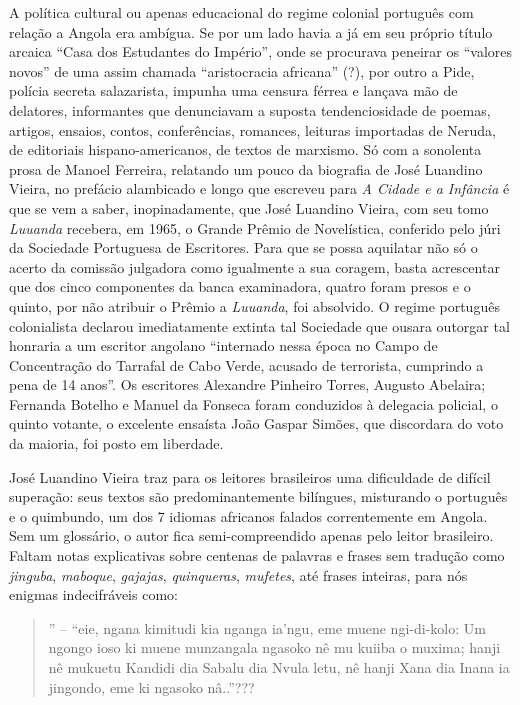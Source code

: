 \documentclass[
  letterpaper,
  DIV=11,
  numbers=noendperiod]{scrreprt}
\begin{document}
A política cultural ou apenas educacional do regime colonial português
com relação a Angola era ambígua. Se por um lado havia a já em seu
próprio título arcaica ``Casa dos Estudantes do Império'', onde se
procurava peneirar os ``valores novos'' de uma assim chamada
``aristocracia africana'' (?), por outro a Pide, polícia secreta
salazarista, impunha uma censura férrea e lançava mão de delatores,
informantes que denunciavam a suposta tendenciosidade de poemas,
artigos, ensaios, contos, conferências, romances, leituras importadas de
Neruda, de editoriais hispano-americanos, de textos de marxismo. Só com
a sonolenta prosa de Manoel Ferreira, relatando um pouco da biografia de
José Luandino Vieira, no prefácio alambicado e longo que escreveu para
\emph{A Cidade e a Infância} é que se vem a saber, inopinadamente, que
José Luandino Vieira, com seu tomo \emph{Luuanda} recebera, em 1965, o
Grande Prêmio de Novelística, conferido pelo júri da Sociedade
Portuguesa de Escritores. Para que se possa aquilatar não só o acerto da
comissão julgadora como igualmente a sua coragem, basta acrescentar que
dos cinco componentes da banca examinadora, quatro foram presos e o
quinto, por não atribuir o Prêmio a \emph{Luuanda}, foi absolvido. O
regime português colonialista declarou imediatamente extinta tal
Sociedade que ousara outorgar tal honraria a um escritor angolano
``internado nessa época no Campo de Concentração do Tarrafal de Cabo
Verde, acusado de terrorista, cumprindo a pena de 14 anos''. Os
escritores Alexandre Pinheiro Torres, Augusto Abelaira; Fernanda Botelho
e Manuel da Fonseca foram conduzidos à delegacia policial, o quinto
votante, o excelente ensaísta João Gaspar Simões, que discordara do voto
da maioria, foi posto em liberdade.

José Luandino Vieira traz para os leitores brasileiros uma dificuldade
de difícil superação: seus textos são predominantemente bilíngues,
misturando o português e o quimbundo, um dos 7 idiomas africanos falados
correntemente em Angola. Sem um glossário, o autor fica
semi-compreendido apenas pelo leitor brasileiro. Faltam notas
explicativas sobre centenas de palavras e frases sem tradução como
\emph{jinguba}, \emph{maboque}, \emph{gajajas}, \emph{quinqueras},
\emph{mufetes}, até frases inteiras, para nós enigmas indecifráveis
como:

\begin{quote}
'' -- ``eie, ngana kimitudi kia nganga ia'ngu, eme muene ngi-di-kolo: Um
ngongo ioso ki muene munzangala ngasoko nê mu kuiiba o muxima; hanji nê
mukuetu Kandidi dia Sabalu dia Nvula letu, nê hanji Xana dia Inana ia
jingondo, eme ki ngasoko nâ..''???
\end{quote}
\end{document}
